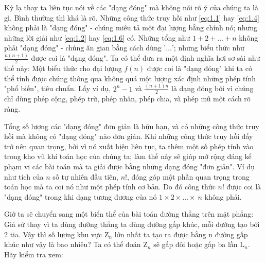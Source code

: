 Kỳ lạ thay ta liên tục nói về các "dạng đóng" mà không nói rõ ý của chúng ta là gì. Bình thường thì khá là rõ. Những công thức truy hồi như \eqref{eq:1.1} hay \eqref{eq:1.4} không phải là "dạng đóng" - chúng miêu tả một đại lượng bằng chính nó; nhưng những lời giải như \eqref{eq:1.2} hay \eqref{eq:1.6} có. Những tổng như $1 + 2 + \dots + n$ không phải "dạng đóng" - chúng ăn gian bằng cách dùng '$\dots$'; nhưng biểu thức như $\frac{n(n + 1)}{2}$ được coi là "dạng đóng". Ta có thể đưa
ra một định nghĩa hơi sơ sài như thế này: Một biểu thức cho đại lượng $f(n)$ được coi là "dạng đóng" khi ta có thể tính được chúng thông qua không quá một lượng xác định những phép tính "phổ biến", tiêu chuẩn. Lấy ví dụ, $2^n - 1$ và $\frac{(n + 1)n}{2}$ là dạng đóng bởi vì chúng chỉ dùng phép cộng, phép trừ, phép nhân, phép chia, và phép mũ một cách rõ ràng.

Tổng số lượng các "dạng đóng" đơn giản là hữu hạn, và có những công thức truy hồi mà không có "dạng đóng" nào đơn giản. Khi những công thức truy hồi đấy trở nên quan trọng, bởi vì nó xuất hiện liên tục, ta thêm một số phép tính vào trong kho vũ khí toán học của chúng ta; làm thế này sẽ giúp mở rộng đáng kể phạm vi các bài toán mà ta giải được bằng những dạng đóng "đơn giản". Ví dụ như tích của $n$ số tự nhiên đầu tiên, $n!$, đóng góp một phần quan trọng trong toán học mà ta coi nó như một phép tính cơ bản. Do đó công thức $n!$ được coi là "dạng đóng" trong khi dạng tương đương của nó $1 \times 2 \times \dots \times \ n$ không phải.

Giờ ta sẽ chuyển sang một biển thể của bài toán đường thẳng trên mặt phẳng: Giả sử thay vì ta dùng đường thẳng ta dùng đường gấp khúc, mỗi đường tạo bởi 2 tia. Vậy thì số lượng khu vực $\mathrm{Z}_n$ lớn nhất ta tạo ra được bằng n đường gấp khúc như vậy là bao nhiêu? Ta có thể đoán $\mathrm{Z}_n$ sẽ gấp đôi hoặc gấp ba lần $\mathrm{L}_n$. Hãy kiểm tra xem:

